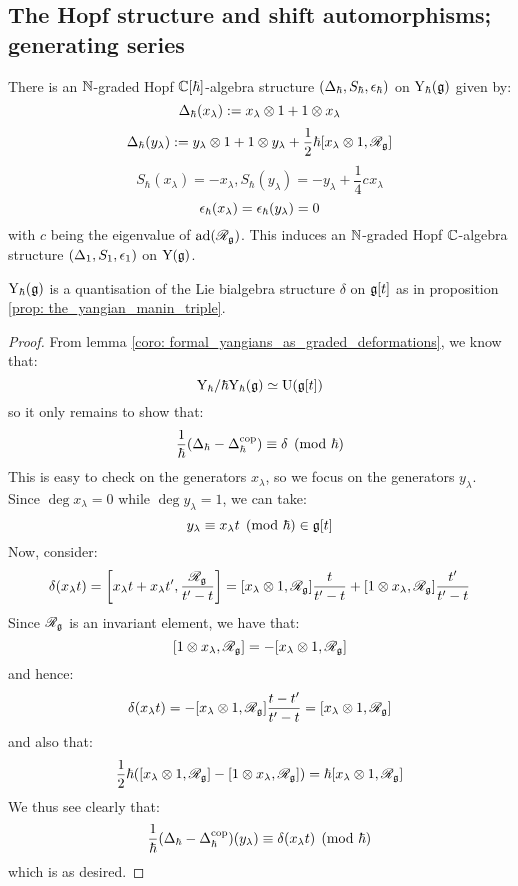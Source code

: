         \subsection{The Hopf structure and shift automorphisms; generating series}
            \begin{theorem} \label{theorem: yangian_hopf_structure}
                There is an $\mathbb{N}$-graded Hopf $\mathbb{C}[\hbar]$-algebra structure $(\Delta_{\hbar}, S_{\hbar}, \epsilon_{\hbar})$ on $\mathrm{Y}_{\hbar}(\mathfrak{g})$ given by:
                    $$\Delta_{\hbar}(x_{\lambda}) := x_{\lambda} \tensor 1 + 1 \tensor x_{\lambda}$$
                    $$\Delta_{\hbar}(y_{\lambda}) := y_{\lambda} \tensor 1 + 1 \tensor y_{\lambda} + \frac12 \hbar [x_{\lambda} \tensor 1, \scrR_{\g}]$$
                    $$S_{\hbar}(x_{\lambda}) = -x_{\lambda}, S_{\hbar}(y_{\lambda}) = -y_{\lambda} + \frac14 c_{} x_{\lambda}$$
                    $$\epsilon_{\hbar}(x_{\lambda}) = \epsilon_{\hbar}(y_{\lambda}) = 0$$
                with $c$ being the eigenvalue of $\mathrm{ad}(\mathscr{R}_{\mathfrak{g}})$. This induces an $\mathbb{N}$-graded Hopf $\mathbb{C}$-algebra structure $(\Delta_1, S_1, \epsilon_1)$ on $\mathrm{Y}(\mathfrak{g})$.
            \end{theorem}
            \begin{corollary} \label{coro: yangians_as_quantisations}
                $\mathrm{Y}_{\hbar}(\mathfrak{g})$ is a quantisation of the Lie bialgebra structure $\delta$ on $\mathfrak{g}[t]$ as in proposition \ref{prop: the_yangian_manin_triple}.
            \end{corollary}
                \begin{proof}
                    From lemma \ref{coro: formal_yangians_as_graded_deformations}, we know that:
                        $$\mathrm{Y}_{\hbar}/\hbar\mathrm{Y}_{\hbar}(\mathfrak{g}) \simeq \mathrm{U}(\mathfrak{g}[t])$$
                    so it only remains to show that:
                        $$\frac{1}{\hbar}( \Delta_{\hbar} - \Delta_{\hbar}^{\mathrm{cop}} ) \equiv \delta \pmod{\hbar}$$
                    This is easy to check on the generators $x_{\lambda}$, so we focus on the generators $y_{\lambda}$. Since $\deg x_{\lambda} = 0$ while $\deg y_{\lambda} = 1$, we can take:
                        $$y_{\lambda} \equiv x_{\lambda} t \pmod{\hbar} \in \mathfrak{g}[t]$$
                    Now, consider:
                        $$\delta(x_{\lambda} t) = \left[ x_{\lambda} t + x_{\lambda} t', \frac{\scrR_{\g}}{t' - t} \right] = [x_{\lambda} \tensor 1, \scrR_{\g}] \frac{t}{t' - t} + [1 \tensor x_{\lambda}, \scrR_{\g}] \frac{t'}{t' - t}$$
                    Since $\mathscr{R}_{\mathfrak{g}}$ is an invariant element, we have that:
                        $$[1 \tensor x_{\lambda}, \scrR_{\g}] = -[x_{\lambda} \tensor 1, \scrR_{\g}]$$
                    and hence:
                        $$\delta(x_{\lambda} t) = -[x_{\lambda} \tensor 1, \scrR_{\g}] \frac{t - t'}{t' - t} = [x_{\lambda} \tensor 1, \scrR_{\g}]$$
                    and also that:
                        $$\frac12 \hbar ( [x_{\lambda} \tensor 1, \scrR_{\g}] - [1 \tensor x_{\lambda}, \scrR_{\g}] ) = \hbar [x_{\lambda} \tensor 1, \scrR_{\g}]$$
                    We thus see clearly that:
                        $$\frac{1}{\hbar}( \Delta_{\hbar} - \Delta_{\hbar}^{\mathrm{cop}} )(y_{\lambda}) \equiv \delta(x_{\lambda} t) \pmod{\hbar}$$
                    which is as desired. 
                \end{proof}
